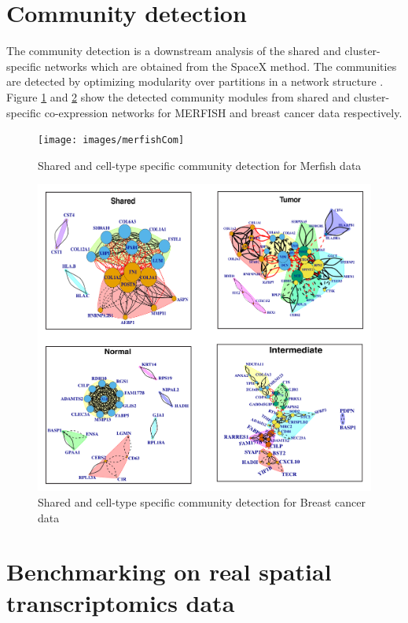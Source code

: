 \documentclass[
]{book}
\begin{document}
\hypertarget{communitydetection}{%
\section{Community detection}\label{communitydetection}}

The community detection is a downstream analysis of the shared and cluster-specific networks which are obtained from the SpaceX method. The communities are detected by optimizing modularity over partitions in a network structure \citep{brandes2007modularity}. Figure \ref{fig:comMERFISH} and \ref{fig:comBC} show the detected community modules from shared and cluster-specific co-expression networks for MERFISH and breast cancer data respectively.

\begin{figure}

{\centering \texttt{[image: images/merfishCom]} 

}

\caption{Shared and cell-type specific community detection for Merfish data}\label{fig:comMERFISH}
\end{figure}

\begin{figure}

{\centering \includegraphics[width=0.8\linewidth]{images/BC_Com} 

}

\caption{Shared and cell-type specific community detection for Breast cancer data}\label{fig:comBC}
\end{figure}

\hypertarget{benchmarking-on-real-spatial-transcriptomics-data}{%
\section{Benchmarking on real spatial transcriptomics data}\label{benchmarking-on-real-spatial-transcriptomics-data}}
\end{document}
